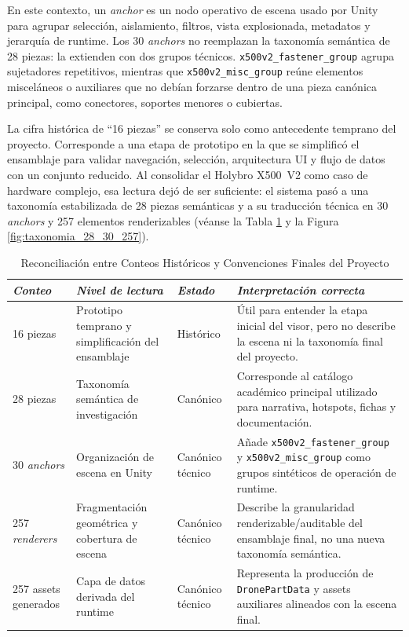 En este contexto, un \textit{anchor} es un nodo operativo de escena usado por Unity para agrupar selección, aislamiento, filtros, vista explosionada, metadatos y jerarquía de runtime. Los 30 \textit{anchors} no reemplazan la taxonomía semántica de 28 piezas: la extienden con dos grupos técnicos. \texttt{x500v2\_fastener\_group} agrupa sujetadores repetitivos, mientras que \texttt{x500v2\_misc\_group} reúne elementos misceláneos o auxiliares que no debían forzarse dentro de una pieza canónica principal, como conectores, soportes menores o cubiertas.

La cifra histórica de ``16 piezas'' se conserva solo como antecedente temprano del proyecto. Corresponde a una etapa de prototipo en la que se simplificó el ensamblaje para validar navegación, selección, arquitectura UI y flujo de datos con un conjunto reducido. Al consolidar el Holybro X500~V2 como caso de hardware complejo, esa lectura dejó de ser suficiente: el sistema pasó a una taxonomía estabilizada de 28 piezas semánticas y a su traducción técnica en 30 \textit{anchors} y 257 elementos renderizables (véanse la Tabla \ref{tab:reconciliacion_conteos_sistema} y la Figura \ref{fig:taxonomia_28_30_257}).

\begin{table}[htbp]
    \caption{Reconciliación entre Conteos Históricos y Convenciones Finales del Proyecto}
    \label{tab:reconciliacion_conteos_sistema}
    \begin{tabularx}{\textwidth}{p{2.4cm}p{3.1cm}p{2.0cm}X}
        \hline
        \textit{Conteo} & \textit{Nivel de lectura} & \textit{Estado} & \textit{Interpretación correcta} \\ \hline
        16 piezas & Prototipo temprano y simplificación del ensamblaje & Histórico & Útil para entender la etapa inicial del visor, pero no describe la escena ni la taxonomía final del proyecto. \\
        28 piezas & Taxonomía semántica de investigación & Canónico & Corresponde al catálogo académico principal utilizado para narrativa, hotspots, fichas y documentación. \\
        30 \textit{anchors} & Organización de escena en Unity & Canónico técnico & Añade \texttt{x500v2\_fastener\_group} y \texttt{x500v2\_misc\_group} como grupos sintéticos de operación de runtime. \\
        257 \textit{renderers} & Fragmentación geométrica y cobertura de escena & Canónico técnico & Describe la granularidad renderizable/auditable del ensamblaje final, no una nueva taxonomía semántica. \\
        257 assets generados & Capa de datos derivada del runtime & Canónico técnico & Representa la producción de \texttt{DronePartData} y assets auxiliares alineados con la escena final. \\ \hline
    \end{tabularx}
\end{table}

